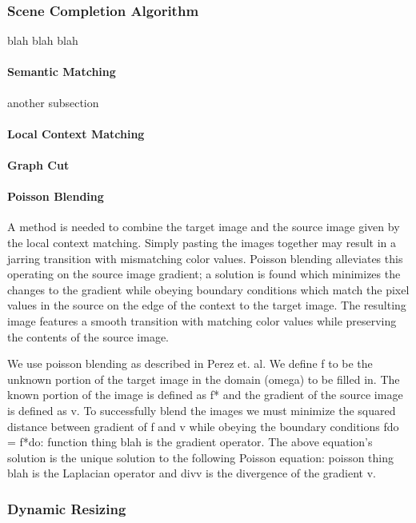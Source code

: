 \documentclass[11pt]{amsart}
\begin{document}
\subsubsection{Scene Completion Algorithm}
blah blah blah

\paragraph{\sc Semantic Matching} 
another subsection

\paragraph{\sc Local Context Matching}

\paragraph{\sc Graph Cut}

\paragraph{\sc Poisson Blending}
A method is needed to combine the target image and the source image given by the local context matching. Simply pasting the images together may result in a jarring transition with mismatching color values. Poisson blending alleviates this operating on the source image gradient; a solution is found which minimizes the changes to the gradient while obeying boundary conditions which match the pixel values in the source on the edge of the context to the target image. The resulting image features a smooth transition with matching color values while preserving the contents of the source image.


We use poisson blending as described in Perez et. al. \cite{Perez:2003} We define f to be the unknown portion of the target image in the domain (omega) to be filled in. The known portion of the image is defined as f* and the gradient of the source image is defined as v. To successfully blend the images we must minimize the squared distance between gradient of f and v while obeying the boundary conditions fdo = f*do:
function thing
blah is the gradient operator. The above equation's solution is the unique solution to the following Poisson equation:
poisson thing
blah is the Laplacian operator and divv is the divergence of the gradient v.

\subsubsection{Dynamic Resizing}
\end{document}

